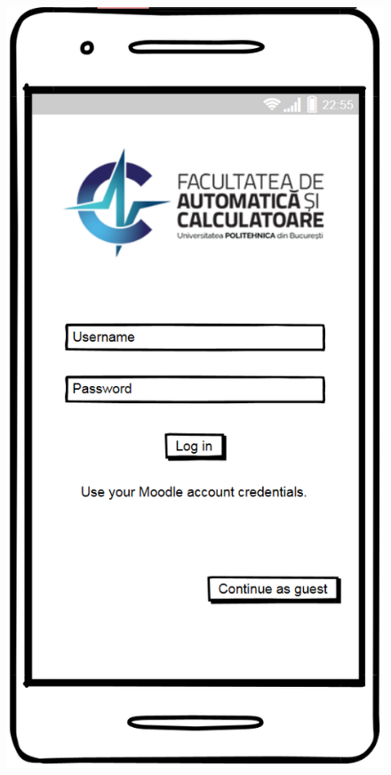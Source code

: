 \begin{figure}[!ht]
    \centering
    \begin{minipage}[b]{0.25\textwidth}
        \captionsetup{justification=centering}
        \includegraphics[width=\textwidth]{figures/app/balsamiq/login.png}

\end{minipage}
\end{figure}
